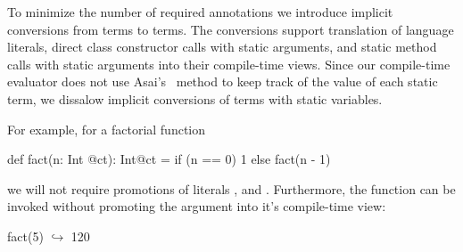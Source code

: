 To minimize the number of required annotations we introduce implicit conversions from  terms to  terms.
 The conversions support translation of language literals, direct class constructor calls with static arguments, and static method
 calls with static arguments into their compile-time views. Since our compile-time evaluator does
 not use Asai's~\cite{asai2002binding,sumii2001hybrid} method to keep track of
 the value of each static term, we dissalow implicit conversions of terms with static variables.

For example, for a factorial function \begin{lstparagraph}
def fact(n: Int @ct): Int@ct =
  if (n == 0) 1 else fact(n - 1)
 \end{lstparagraph} we will not require promotions of literals , and . Furthermore,
 the function can be invoked without promoting the argument into it's compile-time view:\begin{lstparagraph}
fact(5)
  $\hookrightarrow$ 120
 \end{lstparagraph}
